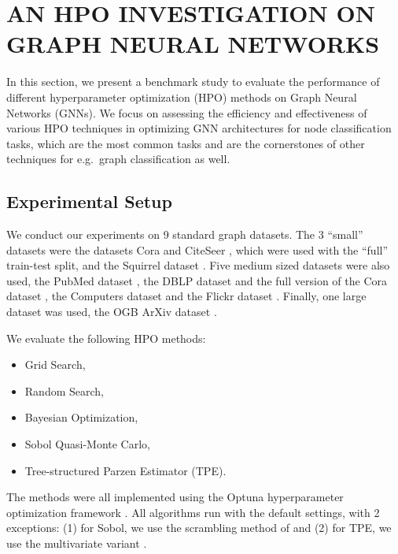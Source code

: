 \section{\uppercase{An HPO Investigation on Graph Neural Networks}}
\label{sec:benchmark}

In this section, we present a benchmark study to evaluate the performance of different hyperparameter optimization (HPO) methods on Graph Neural Networks (GNNs). We focus on assessing the efficiency and effectiveness of various HPO techniques in optimizing GNN architectures for node classification tasks, which are the most common tasks and are the cornerstones of other techniques for e.g.\ graph classification as well.

\subsection{Experimental Setup}
We conduct our experiments on 9 standard graph datasets. The 3 \enquote{small} datasets were the datasets Cora and CiteSeer \cite{yang_revisiting_2016}, which were used with the \enquote{full} train-test split, and the Squirrel dataset \cite{rozemberczki_multi-scale_2021}. Five medium sized datasets were also used, the PubMed dataset \cite{yang_revisiting_2016}, the DBLP dataset and the full version of the Cora dataset \cite{bojchevski_deep_2018}, the Computers dataset \cite{shchur_pitfalls_2019} and the Flickr dataset \cite{zeng_graphsaint_2019}. Finally, one large dataset was used, the OGB ArXiv dataset \cite{hu_open_2021}.

We evaluate the following HPO methods:
\begin{itemize}
	\item Grid Search,
	\item Random Search,
	\item Bayesian Optimization,
	\item Sobol Quasi-Monte Carlo,
	\item Tree-structured Parzen Estimator (TPE).
\end{itemize}
The methods were all implemented using the Optuna hyperparameter optimization framework \cite{akiba_optuna_2019}. All algorithms run with the default settings, with 2 exceptions: (1) for Sobol, we use the scrambling method of \cite{matousek_l2-discrepancy_1998} and (2) for TPE, we use the multivariate variant \cite{falkner_bohb_2018}.

